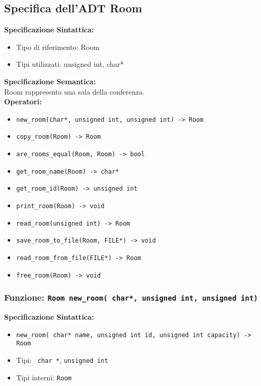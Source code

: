 \documentclass[11pt]{scrartcl} %
\begin{document}
\subsection{Specifica dell'ADT Room}

\textbf{Specificazione Sintattica:}
\begin{itemize}
	\item Tipo di riferimento: Room
	\item Tipi utilizzati: unsigned int, char*
\end{itemize}
\textbf{Specificazione Semantica:} \\
Room rappresenta una sala della conferenza.\\

\textbf{Operatori:} \\
\begin{itemize}
    \item \texttt{new\_room(char*, unsigned int, unsigned int) -> Room}
    \item \texttt{copy\_room(Room) -> Room}
    \item \texttt{are\_rooms\_equal(Room, Room) -> bool}
    \item \texttt{get\_room\_name(Room) ->  char*}
    \item \texttt{get\_room\_id(Room) -> unsigned int}
    \item \texttt{print\_room(Room) -> void}
    \item \texttt{read\_room(unsigned int) -> Room}
    \item \texttt{save\_room\_to\_file(Room, FILE*) -> void}
    \item \texttt{read\_room\_from\_file(FILE*) -> Room}
    \item \texttt{free\_room(Room) -> void}
\end{itemize}



\subsubsection{Funzione: \texttt{Room new\_room( char*, unsigned int, unsigned int)}}

\textbf{Specificazione Sintattica:}
\begin{itemize}
	\item \texttt{new\_room( char* name, unsigned int id, unsigned int capacity) -> Room}
	\item Tipi: \texttt{ char *}, \texttt{unsigned int}
	\item Tipi interni: \texttt{Room}
\end{itemize}
\end{document}
